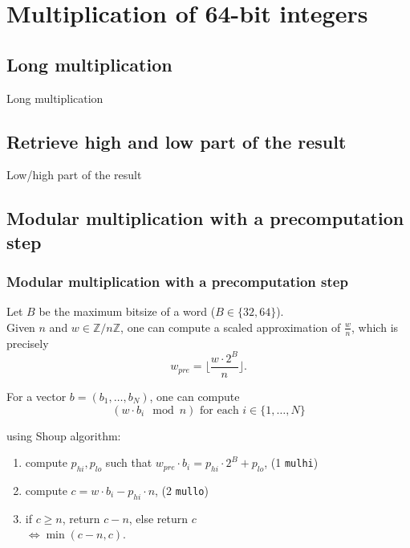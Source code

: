 \documentclass[10pt]{beamer}
\begin{document}
\section{Multiplication of 64-bit integers}
\subsection{Long multiplication}
\begin{frame}
    Long multiplication
\end{frame}

\subsection{Retrieve high and low part of the result}
\begin{frame}
    Low/high part of the result
\end{frame}

\subsection{Modular multiplication with a precomputation step}
\begin{frame}
    \frametitle{Modular multiplication with a precomputation step}

    \begin{example}
    Let $B$ be the maximum bitsize of a word ($B\in \{32, 64\}$). \\
    Given $n$ and $w \in \mathbb{Z}/n\mathbb{Z}$, one can compute a scaled approximation 
    of $\frac{w}{n}$, which is precisely $$ w_{pre} = \biggl\lfloor\dfrac{w\cdot 2^{B}}{n} \biggr\rfloor.$$
    \end{example}

    \bigskip
    For a vector $b = (b_1,\dots, b_N)$, one can compute 
    $$(w\cdot b_i \mod n) \text{ for each } i\in \{1, \dots, N\}$$

    using Shoup algorithm:

    \begin{enumerate}
        \item compute $p_{hi}, p_{lo}$ such that $w_{pre} \cdot b_i = p_{hi}\cdot 2^B + p_{lo}$, \hfill (1 \texttt{mulhi})
        \item compute $c = w\cdot b_i - p_{hi}\cdot n$, \hfill (2 \texttt{mullo})
        \item if $c \geq n$, return $c-n$, else return $c$ \\
            $\Longleftrightarrow \min(c-n, c)$.
    \end{enumerate}
\end{frame}
\end{document}
